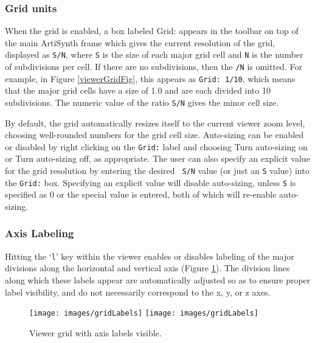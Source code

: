 \documentclass{article}
\begin{document}
\subsubsection{Grid units}
\label{GridUnits}

When the grid is enabled, a box labeled {\sf Grid:} appears in the
toolbar on top of the main ArtiSynth frame which gives the current
resolution of the grid, displayed as {\tt S/N}, where {\tt S} is the
size of each major grid cell and {\tt N} is the number of subdivisions
per cell. If there are no subdivisions, then the {\tt /N} is omitted.
For example, in Figure \ref{viewerGridFig}, this appears as {\tt Grid:
1/10}, which means that the major grid cells have a size of 1.0 and
are each divided into 10 subdivisions. The numeric value of the ratio
{\tt S/N} gives the minor cell size.

By default, the grid automatically resizes itself to the current
viewer zoom level, choosing well-rounded numbers for the grid cell
size. Auto-sizing can be enabled or disabled by right clicking on the
{\tt Grid:} label and choosing {\sf Turn auto-sizing on} or {\sf Turn
auto-sizing off}, as appropriate. The user can also specify an
explicit value for the grid resolution by entering the desired {\tt
S/N} value (or just an {\tt S} value) into the {\tt Grid:} box.
Specifying an explicit value will disable auto-sizing, unless {\tt S}
is specified as 0 or the special value {\tt *} is entered, both of
which will re-enable auto-sizing.

\subsubsection{Axis Labeling}
\label{AxisLabels}

Hitting the `{\tt l}' key within the viewer enables or disables
labeling of the major divisions along the horizontal and vertical axis
(Figure \ref{gridLabels:fig}). The division lines along which these
labels appear are automatically adjusted so as to ensure proper label
visibility, and do not necessarily correspond to the x, y, or z axes.

\begin{figure}[h]
\begin{center}
\iflatexml
\texttt{[image: images/gridLabels]}
\else
\texttt{[image: images/gridLabels]}
\fi
\end{center}
\caption{Viewer grid with axis labels visible.}%
\label{gridLabels:fig}
\end{figure}
\end{document}
